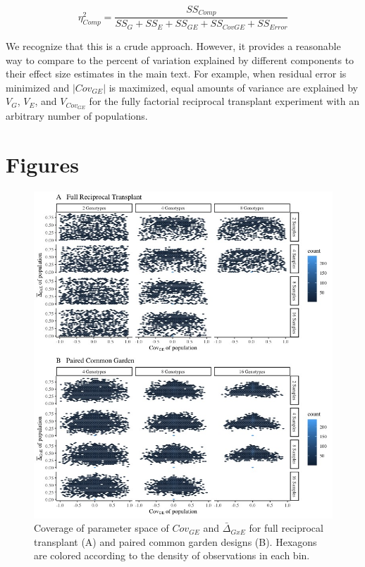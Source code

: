\documentclass[11pt, oneside]{amsart}
\begin{document}
\begin{equation}
\eta^2_{Comp} =  \frac{SS_{Comp}}{SS_G + SS_E + SS_{GE} + SS_{CovGE} + SS_{Error}}
\end{equation}

We recognize that this is a crude approach. However, it provides a reasonable way to compare to the percent of variation explained by different components to their effect size estimates in the main text. For example, when residual error is minimized and $| Cov_{GE} |$ is maximized, equal amounts of variance are explained by $V_G$, $V_E$, and $V_{Cov_{GE}}$ for the fully factorial reciprocal transplant experiment with an arbitrary number of populations. 


\clearpage
\newpage

\renewcommand\thesection{Supplemental Figures}


\section{Figures}

\renewcommand{\figurename}{Supplementary Figure}

\renewcommand\thefigure{S1}
\begin{figure}[h]
\begin{center}
\includegraphics[width=6in]{HexPlot.jpeg}
\end{center}
\label{Fig: Parameter Coverage}
\caption{Coverage of parameter space of $Cov_{GE}$ and $\bar\Delta_{GxE}$ for full reciprocal transplant (A) and paired common garden designs (B). Hexagons are colored according to the density of observations in each bin. }
\end{figure}
\end{document}
